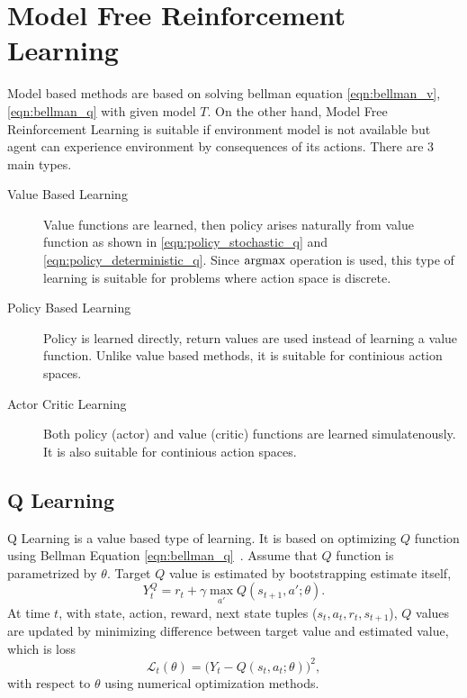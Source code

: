 \section{Model Free Reinforcement Learning}
\label{sec:mf_rl}

Model based methods are based on solving bellman equation \eqref{eqn:bellman_v}, \eqref{eqn:bellman_q} with given model $T$. 
On the other hand, Model Free Reinforcement Learning is suitable 
if environment model is not available but agent can experience environment by consequences of its actions. There are 3 main types. 

\begin{description}
	\item[Value Based Learning] Value functions are learned, 
	then policy arises naturally from value function as shown in \eqref{eqn:policy_stochastic_q} and \eqref{eqn:policy_deterministic_q}. 
	Since $\operatorname{\textup{argmax}}$ operation is used, this type of learning is suitable for problems where action space is discrete. 
	
	\item[Policy Based Learning] Policy is learned directly, 
	return values are used instead of learning a value function. 
	Unlike value based methods, it is suitable for continious action spaces. 
	
	\item[Actor Critic Learning] Both policy (actor) and value (critic) functions are learned simulatenously. 
	It is also suitable for continious action spaces. 
	
\end{description}

\subsection{Q Learning}
Q Learning is a value based type of learning. 
It is based on optimizing $Q$ function using Bellman Equation \eqref{eqn:bellman_q}~\cite{watkins_technical_1992}. 
Assume that $Q$ function is parametrized by $\theta$. 
Target $Q$ value is estimated by bootstrapping estimate itself, 
\begin{equation}
\label{eqn:q_target}
Y_t^Q = r_t + \gamma \max_{a'} Q(s_{t+1},a';\theta).
\end{equation}
At time $t$,  with state, action, reward, next state tuples ($s_t,a_t,r_t,s_{t+1}$), 
$Q$ values are updated by minimizing difference between target value and estimated value, which is loss 
\begin{equation}
\label{eqn:q_loss}
\mathcal{L}_t(\theta) = \big( Y_t - Q(s_t,a_t;\theta) \big) ^ 2, 
\end{equation}
with respect to $\theta$ using numerical optimization methods. 

